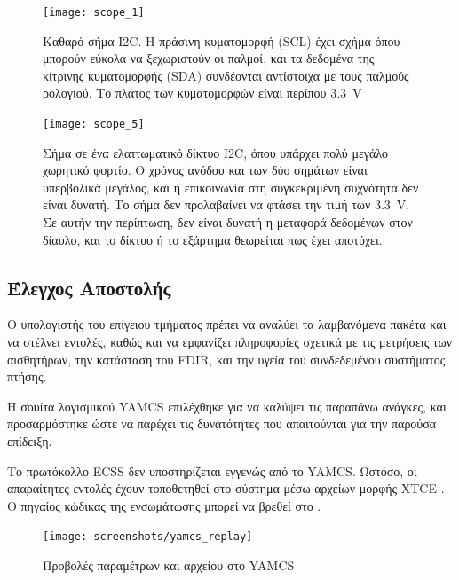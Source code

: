 \documentclass[a4paper,nobib]{tufte-book}
\begin{document}
\begin{figure}[h]
	\texttt{[image: scope\_1]}
	\caption[Καθαρό σήμα \acs{I2C}]{Καθαρό σήμα \acs{I2C}. Η πράσινη κυματομορφή (\acf{SCL}) έχει σχήμα όπου μπορούν εύκολα να ξεχωριστούν οι παλμοί, και τα δεδομένα της κίτρινης κυματομορφής (\acf{SDA}) συνδέονται αντίστοιχα με τους παλμούς ρολογιού. Το πλάτος των κυματομορφών είναι περίπου \SI{3.3}{\volt}}
	\label{subfig:i2c_clean}
\end{figure}

\begin{figure}[h]
	\texttt{[image: scope\_5]}
	\caption[Σήμα σε ένα ελαττωματικό δίκτυο \acs{I2C}]{Σήμα σε ένα ελαττωματικό δίκτυο \acs{I2C}, όπου υπάρχει πολύ μεγάλο χωρητικό φορτίο. Ο χρόνος ανόδου και των δύο σημάτων είναι υπερβολικά μεγάλος, και η επικοινωνία στη συγκεκριμένη συχνότητα δεν είναι δυνατή. Το σήμα δεν προλαβαίνει να φτάσει την τιμή των \SI{3.3}{\volt}. Σε αυτήν την περίπτωση, δεν είναι δυνατή η μεταφορά δεδομένων στον δίαυλο, και το δίκτυο ή το εξάρτημα θεωρείται πως έχει αποτύχει.}
	\label{subfig:i2c_dirty}
\end{figure}

\FloatBarrier

\subsection{Έλεγχος Αποστολής}

Ο υπολογιστής του επίγειου τμήματος πρέπει να αναλύει τα λαμβανόμενα πακέτα και να στέλνει εντολές, καθώς και να εμφανίζει πληροφορίες σχετικά με τις μετρήσεις των αισθητήρων, την κατάσταση του \ac{FDIR}, και την υγεία του συνδεδεμένου συστήματος πτήσης.

Η σουίτα λογισμικού \acs{YAMCS} \autocite{sela_yamcs_lightweight_2012} επιλέχθηκε για να καλύψει τις παραπάνω ανάγκες, και προσαρμόστηκε ώστε να παρέχει τις δυνατότητες που απαιτούνται για την παρούσα επίδειξη.

Το πρωτόκολλο \ac{ECSS} \autocite{ECSS-E-ST-70-41C} δεν υποστηρίζεται εγγενώς από το \acs{YAMCS}. Ωστόσο, οι απαραίτητες εντολές έχουν τοποθετηθεί στο σύστημα μέσω αρχείων μορφής \ac{XTCE} \autocite{simon_xtce_standard_2004}. Ο πηγαίος κώδικας της ενσωμάτωσης μπορεί να βρεθεί στο .

\begin{figure}[h]
	\texttt{[image: screenshots/yamcs\_replay]}
	\caption{Προβολές παραμέτρων και αρχείου στο \acs{YAMCS}}
\end{figure}
\end{document}
